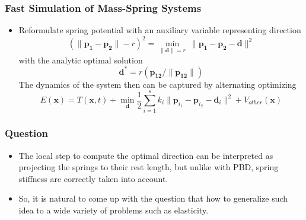 \documentclass[serif,mathserif]{beamer}
\begin{document}
\begin{frame}
  \frametitle{Fast Simulation of Mass-Spring Systems}
  \begin{itemize}
   \item Reformulate spring potential with an auxiliary variable representing direction
    \begin{equation*}
     (\|\mathbf{p_1}-\mathbf{p_2}\|-r)^2=\underset{\|\mathbf{d}\|=r}\min~\|\mathbf{p_1}-\mathbf{p_2}-\mathbf{d}\|^2
    \end{equation*}
   with the analytic optimal solution
   \begin{equation*}
    \mathbf{d}^* = r(\mathbf{p_{12}}/\|\mathbf{p_{12}}\|)
   \end{equation*}
  The dynamics of the system then can be captured by alternating optimizing
  \begin{equation*}
   E(\mathbf{x}) = T(\mathbf{x},t)+\min_{\mathbf{d}}\frac{1}{2}\sum_{i=1}^s k_i\|\mathbf{p}_{i_1}-\mathbf{p}_{i_2}-\mathbf{d}_i\|^2+V_{other}(\mathbf{x})
  \end{equation*}

  \end{itemize}
\end{frame}


\begin{frame}
  \frametitle{Question}
  \begin{itemize}
   \item The local step to compute the optimal direction can be interpreted as projecting the springs to their 
   rest length, but unlike with PBD, spring stiffness are correctly taken into account.
   \item So, it is natural to come up with the question that how to generalize such idea to a wide variety of problems 
   such as elasticity.
  \end{itemize}
\end{frame}
\end{document}
